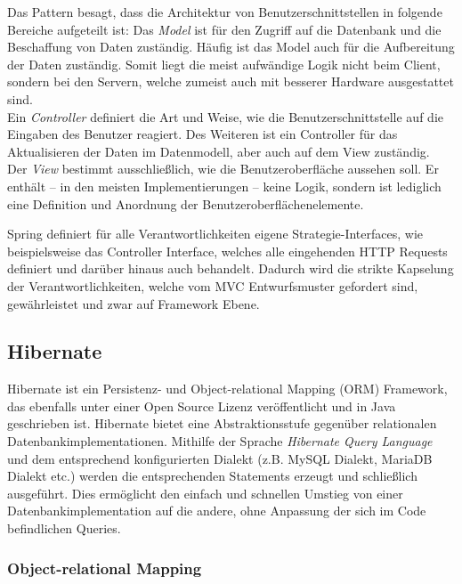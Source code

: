 				Das Pattern besagt, dass die Architektur von Benutzerschnittstellen in folgende Bereiche aufgeteilt ist: Das \textit{Model} ist für den Zugriff auf die Datenbank und die Beschaffung von Daten zuständig. Häufig ist das Model auch für die Aufbereitung der Daten zuständig. Somit liegt die meist aufwändige Logik nicht beim Client, sondern bei den Servern, welche zumeist auch mit besserer Hardware ausgestattet sind. \\
				Ein \textit{Controller} definiert die Art und Weise, wie die Benutzerschnittstelle auf die Eingaben des Benutzer reagiert. Des Weiteren ist ein Controller für das Aktualisieren der Daten im Datenmodell, aber auch auf dem View zuständig. \\
				Der \textit{View} bestimmt ausschließlich, wie die Benutzeroberfläche aussehen soll. Er enthält -- in den meisten Implementierungen -- keine Logik, sondern ist lediglich eine Definition und Anordnung der Benutzeroberflächenelemente.
				
				Spring definiert für alle Verantwortlichkeiten eigene Strategie-Interfaces, wie beispielsweise das Controller Interface, welches alle eingehenden \acs{HTTP} Requests definiert und darüber hinaus auch behandelt. Dadurch wird die strikte Kapselung der Verantwortlichkeiten, welche vom \acs{MVC} Entwurfsmuster gefordert sind, gewährleistet und zwar auf Framework Ebene. 

		
		\subsection{Hibernate} %
		
			Hibernate \cite{Hibernate.3172020} ist ein Persistenz- und Object-relational Mapping (\acs{ORM}) Framework, das ebenfalls unter einer Open Source Lizenz veröffentlicht und in Java geschrieben ist. Hibernate bietet eine Abstraktionsstufe gegenüber relationalen Datenbankimplementationen. Mithilfe der Sprache \textit{Hibernate Query Language} und dem entsprechend konfigurierten Dialekt (z.B. MySQL Dialekt, MariaDB Dialekt etc.) werden die entsprechenden Statements erzeugt und schließlich ausgeführt. Dies ermöglicht den einfach und schnellen Umstieg von einer Datenbankimplementation auf die andere, ohne Anpassung der sich im Code befindlichen Queries. 
			
			\subsubsection{Object-relational Mapping} %
		
